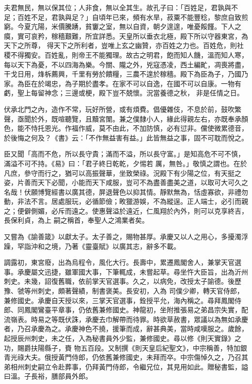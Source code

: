 \begin{pinyinscope}
 夫君無民，無以保其位；人非食，無以全其生。故孔子曰：「百姓足，君孰與不足；百姓不足，君孰與足？」自頃年已來，頻有水旱，菽粟不能豐稔，黎庶自致煎窮。今夏亢陽，米價騰踴，貧窶之室，無以自資，朝夕遑遑，唯憂餒饉。下人之瘼，實可哀矜，稼穡艱難，所宜詳悉。天皇所以垂衣北極，殿下所以守器東宮，為天下之所尊，
 得天下之所利者，豈唯上玄之幽贊，亦百姓之力也。百姓危，則社稷不得獨安。百姓亂，則帝王不能獨理。故古之明君，飽而知人饑，溫而知人寒，每以天下為憂，不以四海為樂。今關、隴之外，兇寇憑凌，西土編甿，凋喪將盡，干戈日用，烽柝薦興，千里有勞於饋糧，三農不遑於稼穡。殿下為臣為子，乃國乃家。為臣在於竭忠，為子期於盡孝。在家不可以自逸，在國不可以自康。一物有虧，聖上每留神念；三邊或梗，殿下豈不兢懷。況當養德之秋，
 非是任情之日。



 伏承北門之內，造作不常，玩好所營，或有煩費。倡優雜伎，不息於前，鼓吹繁聲，亟聞於外，既喧聽覽，且黷宮闈。兼之僕隸小人，緣此得親左右，亦既奉承顏色，能不恃托恩光。作福作威，莫不由此，不加防慎，必有愆非。儻使微累德音，於後悔之何及？《書》云：「不作無益害有益。」此皆無益之事，固不可耽而悅之。



 臣又聞「高而不危，所以長守貴；滿而不溢，所以長守富。」是知高危不可不慎，滿溢不可不持。《易》曰：「君子終日乾乾，夕惕若
 厲，無咎。」敬慎之謂也。在於凡庶，參守而行之，猶可以高振聲華，坐致榮祿。況殿下有少陽之位，有天挺之姿，片善而天下必聞，小能而天下咸服，豈可不為盡善盡美之道，以取可大可久之名哉！伏願博覽經書以廣其德，屏退聲色以抑其情。靜默無為，恬虛寡欲，非禮勿動，非法不言。居處服玩，必循節儉；畋獵游娛，不為縱逞。正人端士，必引而親之；便僻側媚，必斥而遠之。使惠聲溢於遠近，仁風翔於內外，則可以克享終吉，長保利貞，為上
 嗣之稱首，奉聖人之鴻業者矣。



 又嘗為《諭善箴》以獻太子。太子善之，賜物甚厚。承慶又以人之用心，多擾濁浮躁，罕詣沖和之境，乃著《靈臺賦》以廣其志，辭多不載。



 調露初，東宮廢，出為烏程令，風化大行。長壽中，累遷鳳閣舍人，兼掌天官選事。承慶屬文迅捷，雖軍國大事，下筆輒成，未嘗起草。尋坐忤大臣旨，出為沂州刺史。未幾，詔復舊職，依前掌天官選事。久之，以病免，改授太子諭德。後歷豫、虢等州刺史，頗著聲績，制書褒美。長安初，入為
 司僕少卿，轉天官侍郎，兼修國史。承慶自天授以來，三掌天官選事，銓授平允，海內稱之。尋拜鳳閣侍郎、同鳳閣鸞臺平章事，仍依舊兼修國史。神龍初，坐附推張易之弟昌宗失實，配流嶺表。時易之等既伏誅，承慶去巾解帶而待罪。時欲草赦書，眾議以為無如承慶者，乃召承慶為之。承慶神色不撓，援筆而成，辭甚典美，當時咸嘆服之。歲餘，起授辰州刺史，未之任，入為秘書員外少監，兼修國史。尋以修《則天實錄》之功，賜爵扶陽縣子，賚
 物五百段。又制撰《則天皇后紀聖文》，中宗稱善，特加銀青光祿大夫。俄授黃門侍郎，仍依舊兼修國史，未拜而卒。中宗傷悼久之，乃召其弟相州刺史嗣立令赴葬事，仍拜黃門侍郎，令繼兄位，其見用如此。贈秘書監，謚曰溫。子長裕，膳部員外郎。




\end{pinyinscope}

